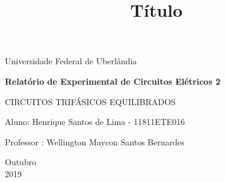 \documentclass[a4paper, 12pt]{article}
\begin{document}
\begin{titlepage}
	\begin{center}
	

		\Huge{Universidade Federal de Uberlândia}\\
	\vspace{15pt}
        
        \vspace{85pt}
        
		\textbf{\LARGE{Relatório de Experimental de Circuitos Elétricos 2}}
		\title{\large{Título}}
			
	\end{center}
\vspace{1,5cm}
	
	\begin{flushright}

   \begin{list}{}{
      \setlength{\leftmargin}{4.5cm}
      \setlength{\rightmargin}{0cm}
      \setlength{\labelwidth}{0pt}
      \setlength{\labelsep}{\leftmargin}}

      \item 
      CIRCUITOS TRIFÁSICOS EQUILIBRADOS 
      \begin{list}{}{
      \setlength{\leftmargin}{0cm}
      \setlength{\rightmargin}{0cm}
      \setlength{\labelwidth}{0pt}
      \setlength{\labelsep}{\leftmargin}}

			\item Aluno:  Henrique Santos de Lima - 11811ETE016\
            \item Professor : Wellington Maycon Santos Bernardes\
      		

      \end{list}
   \end{list}
\end{flushright}
\vspace{1cm}
\begin{center}
		\vspace{\fill}
			 Outubro\\
		 2019
			\end{center}
\end{titlepage}

\tableofcontents
\end{document}
